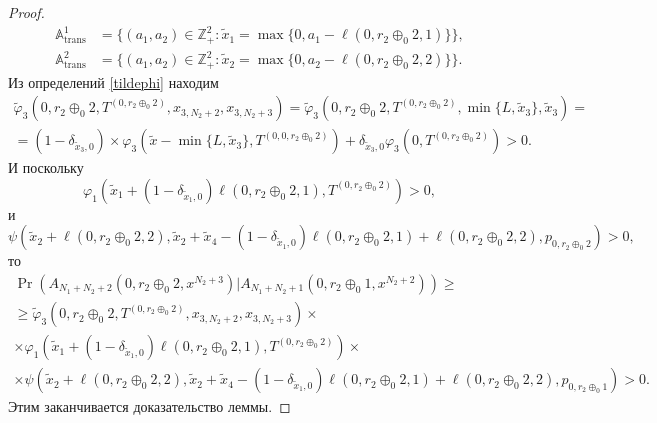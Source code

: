 \begin{proof}
\begin{align*}
{\mathbb A}_{\mathrm{trans}}^1 &= \{(a_1,  a_2) \in \mathbb{Z}_+^2 \colon \tilde{x}_1 = \max{\{0,  a_1-\ell(0,  r_2 \oplus_0 2,  1)\}}\}, \\
{\mathbb A}_{\mathrm{trans}}^2 &= \{(a_1,  a_2) \in \mathbb{Z}_+^2 \colon  \tilde{x}_2 = \max{\{0,  a_2-\ell(0,  r_2 \oplus_0 2,  2)\}}\}.
\end{align*}
Из определений \eqref{tildephi} находим
\begin{multline*}
\widetilde{\varphi}_3(0, r_2 \oplus_0 2,  T^{(0, r_2 \oplus_0 2)},  x_{3,  N_2+2}, x_{3,  N_2+3})= \widetilde{\varphi}_3(0, r_2 \oplus_0 2,  T^{(0, r_2 \oplus_0 2)},  \min\{L,  \tilde{x}_3\},  \tilde{x}_3)=\\
= (1-\delta_{\tilde{x}_3,  0}) \times \varphi_3(\tilde{x} - \min\{L,  \tilde{x}_3\},  T^{(0,  0, r_2 \oplus_0 2)} ) + \delta_{\tilde{x}_3,  0} \varphi_3 (0,  T^{(0, r_2 \oplus_0 2)})  > 0.
\end{multline*}
И поскольку 
\begin{equation*}
\varphi_1(  \tilde{x}_1 + (1 - \delta_{\tilde{x}_1, 0})\ell(0,  r_2 \oplus_0 2,  1),  T^{(0,  r_2 \oplus_0 2)}) > 0, 
\end{equation*}
и 
\begin{equation*}
    \psi(\tilde{x}_2 + \ell(0,  r_2 \oplus_0 2,  2),  \tilde{x}_2 + \tilde{x}_4 - (1 - \delta_{\tilde{x}_1, 0})\ell(0, r_2 \oplus_0 2, 1) + \ell(0,  r_2 \oplus_0 2, 2),  p_{0,  r_2 \oplus_0 2}) > 0, 
\end{equation*}
то
\begin{multline*}
\Pr( A_{N_1 + N_2 + 2} (0,  r_2 \oplus_0 2,  x^{N_2+3})
|A_{N_1 + N_2+1} (0,  r_2 \oplus_0 1,  x^{N_2 + 2}) )
\geqslant \\
\geqslant \widetilde{\varphi}_3(0, r_2 \oplus_0 2,  T^{(0, r_2 \oplus_0 2)},  x_{3,  N_2 + 2}, x_{3,  N_2 + 3})
\times \\
\times \varphi_1(  \tilde{x}_1 + (1 - \delta_{\tilde{x}_1, 0})\ell(0,  r_2 \oplus_0 2,  1),  T^{(0,  r_2 \oplus_0 2)}) \times \\
\times \psi(\tilde{x}_2 + \ell(0,  r_2 \oplus_0 2,  2),  \tilde{x}_2 + \tilde{x}_4 - (1 - \delta_{\tilde{x}_1, 0})\ell(0, r_2 \oplus_0 2, 1) + \ell(0,  r_2 \oplus_0 2, 2),  p_{0,  r_2 \oplus_0 1})  > 0.
\end{multline*}
Этим заканчивается доказательство леммы.

\end{proof}
























